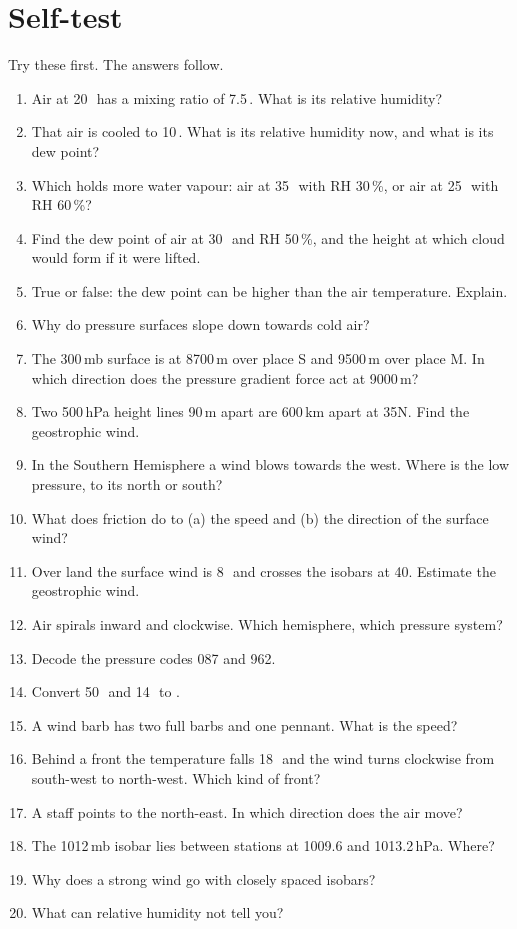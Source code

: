 \section{Self-test}\label{p3-sec:selftest}

Try these first. The answers follow.

\begin{tryit}
\begin{enumerate}[label=\textbf{S\arabic*.},leftmargin=*,itemsep=3pt]
\item Air at 20\,\degC\ has a mixing ratio of 7.5\,\gkg. What is its relative humidity?
\item That air is cooled to 10\,\degC. What is its relative humidity now, and what is its dew point?
\item Which holds more water vapour: air at 35\,\degC\ with RH 30\,\%, or air at 25\,\degC\ with RH 60\,\%?
\item Find the dew point of air at 30\,\degC\ and RH 50\,\%, and the height at which cloud would form if it were lifted.
\item True or false: the dew point can be higher than the air temperature. Explain.
\item Why do pressure surfaces slope down towards cold air?
\item The 300\,mb surface is at 8700\,m over place S and 9500\,m over place M. In which direction does the pressure gradient force act at 9000\,m?
\item Two 500\,hPa height lines 90\,m apart are 600\,km apart at 35\deg N. Find the geostrophic wind.
\item In the Southern Hemisphere a wind blows towards the west. Where is the low pressure, to its north or south?
\item What does friction do to (a) the speed and (b) the direction of the surface wind?
\item Over land the surface wind is 8\,\ms\ and crosses the isobars at 40\deg. Estimate the geostrophic wind.
\item Air spirals inward and clockwise. Which hemisphere, which pressure system?
\item Decode the pressure codes 087 and 962.
\item Convert 50\,\degF\ and 14\,\degF\ to \degC.
\item A wind barb has two full barbs and one pennant. What is the speed?
\item Behind a front the temperature falls 18\,\degF\ and the wind turns clockwise from south-west to north-west. Which kind of front?
\item A staff points to the north-east. In which direction does the air move?
\item The 1012\,mb isobar lies between stations at 1009.6 and 1013.2\,hPa. Where?
\item Why does a strong wind go with closely spaced isobars?
\item What can relative humidity not tell you?
\end{enumerate}
\end{tryit}

